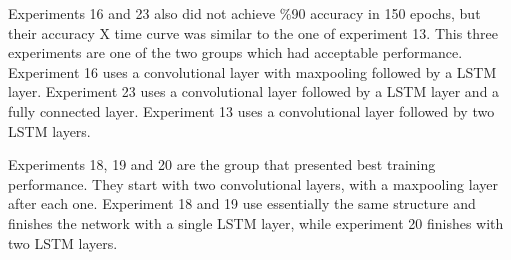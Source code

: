 Experiments 16 and 23 also did not achieve \%90 accuracy in 150 epochs, but their accuracy X time curve was similar to the one of experiment 13. This three experiments are one of the two groups which had acceptable performance.
Experiment 16 uses a convolutional layer with maxpooling followed by a LSTM layer. Experiment 23 uses a convolutional layer followed by a LSTM layer and a fully connected layer.
Experiment 13 uses a convolutional layer followed by two LSTM layers.


Experiments 18, 19 and 20 are the group that presented best training performance. They start with two convolutional layers, with a maxpooling layer after each one. Experiment 18 and 19 use essentially the same structure and finishes the network with a single LSTM layer, while experiment 20 finishes with two LSTM layers.


